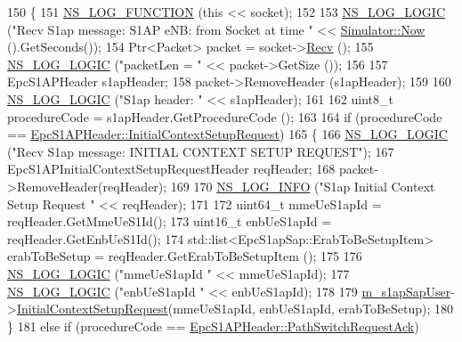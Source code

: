 \begin{DoxyCode}
150 \{
151   \hyperlink{log-macros-disabled_8h_a90b90d5bad1f39cb1b64923ea94c0761}{NS\_LOG\_FUNCTION} (\textcolor{keyword}{this} << socket);
152 
153   \hyperlink{group__logging_ga88acd260151caf2db9c0fc84997f45ce}{NS\_LOG\_LOGIC} (\textcolor{stringliteral}{"Recv S1ap message: S1AP eNB: from Socket at time "} << 
      \hyperlink{classns3_1_1Simulator_ac3178fa975b419f7875e7105be122800}{Simulator::Now} ().GetSeconds());
154   Ptr<Packet> packet = socket->\hyperlink{classns3_1_1Socket_a8949b1f844aae563446f2f4c5be8827a}{Recv} ();
155   \hyperlink{group__logging_ga88acd260151caf2db9c0fc84997f45ce}{NS\_LOG\_LOGIC} (\textcolor{stringliteral}{"packetLen = "} << packet->GetSize ());
156 
157   EpcS1APHeader s1apHeader;
158   packet->RemoveHeader (s1apHeader);
159 
160   \hyperlink{group__logging_ga88acd260151caf2db9c0fc84997f45ce}{NS\_LOG\_LOGIC} (\textcolor{stringliteral}{"S1ap header: "} << s1apHeader);
161 
162   uint8\_t procedureCode = s1apHeader.GetProcedureCode ();
163 
164   \textcolor{keywordflow}{if} (procedureCode == \hyperlink{classns3_1_1EpcS1APHeader_aedd7ba8568bf04ce8960bd840712a63eaee7f11dc02c8f9c13cc21727512cb72f}{EpcS1APHeader::InitialContextSetupRequest})
165   \{
166     \hyperlink{group__logging_ga88acd260151caf2db9c0fc84997f45ce}{NS\_LOG\_LOGIC} (\textcolor{stringliteral}{"Recv S1ap message: INITIAL CONTEXT SETUP REQUEST"});
167     EpcS1APInitialContextSetupRequestHeader reqHeader;
168     packet->RemoveHeader(reqHeader);
169 
170     \hyperlink{group__logging_gafbd73ee2cf9f26b319f49086d8e860fb}{NS\_LOG\_INFO} (\textcolor{stringliteral}{"S1ap Initial Context Setup Request "} << reqHeader);
171 
172     uint64\_t mmeUeS1apId = reqHeader.GetMmeUeS1Id();
173     uint16\_t enbUeS1apId = reqHeader.GetEnbUeS1Id();
174     std::list<EpcS1apSap::ErabToBeSetupItem> erabToBeSetup = reqHeader.GetErabToBeSetupItem ();
175     
176     \hyperlink{group__logging_ga88acd260151caf2db9c0fc84997f45ce}{NS\_LOG\_LOGIC} (\textcolor{stringliteral}{"mmeUeS1apId "} << mmeUeS1apId);
177     \hyperlink{group__logging_ga88acd260151caf2db9c0fc84997f45ce}{NS\_LOG\_LOGIC} (\textcolor{stringliteral}{"enbUeS1apId "} << enbUeS1apId);
178 
179     \hyperlink{classns3_1_1EpcS1apEnb_a6905f0d78d5d39dd5f6d521ec9615713}{m\_s1apSapUser}->\hyperlink{classns3_1_1EpcS1apSapEnb_accce076a97c96f48445de059c302e0ad}{InitialContextSetupRequest}(mmeUeS1apId, 
      enbUeS1apId, erabToBeSetup);
180   \} 
181   \textcolor{keywordflow}{else} \textcolor{keywordflow}{if} (procedureCode == \hyperlink{classns3_1_1EpcS1APHeader_aedd7ba8568bf04ce8960bd840712a63ea4c73b45629052b31f0636b3ba4b9d58f}{EpcS1APHeader::PathSwitchRequestAck})

\end{DoxyCode}
